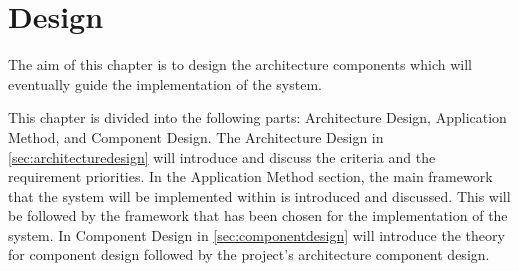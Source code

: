 \chapter{Design}\label{design}
The aim of this chapter is to design the architecture components which will eventually guide the implementation of the system.

This chapter is divided into the following parts: Architecture Design, Application Method, and Component Design.
The Architecture Design in \cref{sec:architecturedesign} will introduce and discuss the criteria and the requirement priorities.
In the Application Method section, the main framework that the system will be implemented within is introduced and discussed.
This will be followed by the framework that has been chosen for the implementation of the system.
In Component Design in \cref{sec:componentdesign} will introduce the theory for component design followed by the project's architecture component design.





